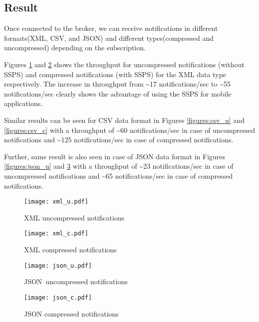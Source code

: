 \subsection{Result}

Once connected to the broker, we can receive notifications in different formats(XML, CSV, and JSON) and different types(compressed and uncompressed) depending on the subscription.

Figures \ref{figures:xml_u} and \ref{figures:xml_c} shows the throughput for uncompressed notifications (without SSPS) and compressed notifications (with SSPS) for the XML data type respectively. The increase in throughput from \textasciitilde17 notifications/sec to \textasciitilde55 notifications/sec clearly shows the advantage of using the SSPS for mobile applications.

Similar results can be seen for CSV data format in Figures \ref{figures:csv_u} and \ref{figures:csv_c} with a throughput of \textasciitilde60 notifications/sec in case of uncompressed notifications and \textasciitilde125 notifications/sec in case of compressed notifications. 

Further, same result is also seen in case of JSON data format in Figures \ref{figures:json_u} and \ref{figures:json_c} with a throughput of \textasciitilde23 notifications/sec in case of uncompressed notifications and \textasciitilde65 notifications/sec in case of compressed notifications.

\makeatletter
\setlength{\intextsep}{20pt}
\makeatother

\begin{figure}[h!]
\centering
\texttt{[image: xml\_u.pdf]}
\caption{XML uncompressed notifications}\label{figures:xml_u}
\end{figure}


\begin{figure}[h!]
\centering
\texttt{[image: xml\_c.pdf]}
\caption{XML compressed notifications}\label{figures:xml_c}
\end{figure}


\makeatletter
\setlength{\@fptop}{0pt plus 1fil}
\setlength{\@fpbot}{0pt plus 1fil}
\makeatother

\begin{figure}
\noindent\begin{minipage}{.5\textwidth}
  \texttt{[image: json\_u.pdf]}
  \captionsetup{width=0.9\textwidth}
  \caption{JSON~uncompressed notifications}
  \label{figures:json_u}
\end{minipage}%
\noindent\begin{minipage}{.5\textwidth}
  \texttt{[image: json\_c.pdf]}
  \captionsetup{width=0.9\textwidth}
  \caption{JSON compressed notifications}
  \label{figures:json_c}
\end{minipage}
\end{figure}




